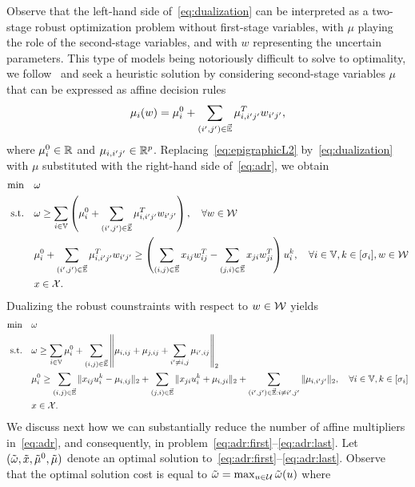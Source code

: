 \documentclass[12pt]{article}
\begin{document}
\begin{appendix}
Observe that the left-hand side of~\eqref{eq:dualization} can be interpreted as a two-stage robust optimization problem without first-stage variables, with $\mu$ playing the role of the second-stage variables, and with $w$ representing the uncertain parameters. This type of models being notoriously difficult to solve to optimality, we follow~\cite[Lemma~1]{zhen2021robust} and seek a heuristic solution by considering second-stage variables $\mu$ that can be expressed as affine decision rules
\begin{equation}
\label{eq:adr}
 \mu_i({w})=\mu_i^0+\sum_{(i',j')\in \Vec{\mathbb{E}}} \mu_{i,i'j'}^T w_{i'j'},
\end{equation}
where $\mu_i^0\in\mathbb{R}$ and $\mu_{i,i'j'}\in\mathbb{R}^p$. Replacing~\eqref{eq:epigraphicL2} by~\eqref{eq:dualization} with $\mu$ substituted with the right-hand side of~\eqref{eq:adr}, we obtain
\begin{align*}
\min\quad & \omega \nonumber\\
\mbox{s.t.}\quad & \omega \geq \sum_{i\in \mathbb{V}}\left(\mu_i^0+\sum_{(i',j')\in \Vec{\mathbb{E}}} \mu_{i,i'j'}^T w_{i'j'}\right), \quad \forall{w}\in\mathcal{W}\\
& \mu_i^0+\sum_{(i',j')\in \Vec{\mathbb{E}}} \mu_{i,i'j'}^T w_{i'j'} \geq \left(\sum_{(i,j)\in \Vec{\mathbb{E}}} x_{ij}w_{ij}^T-\sum_{(j,i)\in \Vec{\mathbb{E}}} x_{ji}w_{ji}^T\right)u_i^k, \quad\forall i\in \mathbb{V},k\in[{\sigma_{i}}], {w}\in\mathcal{W}\\
& x \in \mathcal{X}.\nonumber
\end{align*}
Dualizing the robust counstraints with respect to $w\in \mathcal{W}$ yields
\begin{align}
\min\quad & \omega \label{eq:adr:first}\\
\mbox{s.t.}\quad & \omega \geq \sum_{i\in \mathbb{V}}\mu_i^0+\sum_{(i,j)\in \Vec{\mathbb{E}}} \left\|\mu_{i,ij}+\mu_{j,ij}+\sum_{i'\neq i,j}\mu_{i',ij}\right\|_2\\
& \mu_i^0 \geq \sum_{(i,j)\in \Vec{\mathbb{E}}} \|x_{ij}u_i^k-\mu_{i,ij}\|_2+\sum_{(j,i)\in \Vec{\mathbb{E}}} \|x_{ji}u_i^k+\mu_{i,ji}\|_2 + \sum_{(i',j')\in \Vec{\mathbb{E}}:i\neq i',j'} \|\mu_{i,i'j'}\|_2, \quad\forall i\in \mathbb{V},k\in[{\sigma_{i}}]\label{eq:robustreformulationmu0}\\
& x \in \mathcal{X}.\label{eq:adr:last}
\end{align}
We discuss next how we can substantially reduce the number of affine multipliers in~\eqref{eq:adr}, and consequently, in problem~\eqref{eq:adr:first}--\eqref{eq:adr:last}. Let $(\tilde{\omega},\tilde{x},\tilde{\mu}^0,\tilde{\mu})$ denote an optimal solution to~\eqref{eq:adr:first}--\eqref{eq:adr:last}. Observe that the optimal solution cost is equal to $\tilde{\omega}=\max_{u\in\mathcal{U}}\tilde{\omega}(u)$ where

\end{appendix}
\end{document}
